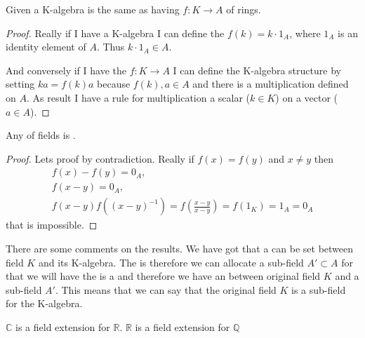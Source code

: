 \begin{lemma}
Given a K-algebra is the same as
having  $f: K \rightarrow A$ of rings.
\begin{proof}
Really if I have a K-algebra I can define the
 $f(k) = k \cdot 1_A$, where $1_A$ is an
identity element of $A$. Thus $k \cdot 1_A \in A$.

And conversely if I have the 
$f: K \rightarrow A$
I can define the K-algebra structure by setting
$k a = f(k) a$ because $f(k), a \in A$ and there is a multiplication
defined on $A$. As result I have a rule for multiplication a scalar
($k \in K$) on a vector ($a \in A$).
\end{proof}
\end{lemma}

\begin{lemma}
Any  of fields is
.
\begin{proof}
Lets proof by contradiction.
Really if $f(x) = f(y)$ and $x \ne y$ then
\begin{eqnarray}
  f(x) - f(y) = 0_A,
  \nonumber \\
  f(x - y) = 0_A,
  \nonumber \\
  f(x - y) f(\left(x - y\right)^{-1}) =
  f\left(\frac{x - y}{x - y}\right) = f(1_K) = 1_A = 0_A
  \nonumber
\end{eqnarray}
that is impossible.
\end{proof}
\end{lemma}

There are some comments on the results. We have got that a
 can be set between field $K$ and its
K-algebra.
The  is 
therefore we can allocate a sub-field $A' \subset A$ for that we will
have the  is a  and
therefore we have an  between original field $K$
and a sub-field $A'$. This means that we can say that the original
field $K$ is a sub-field for the K-algebra.

\begin{example}
  $\mathbb{C}$ is a field extension for $\mathbb{R}$.
  $\mathbb{R}$ is a field extension for $\mathbb{Q}$
  \label{ex:fieldextension}
\end{example}

